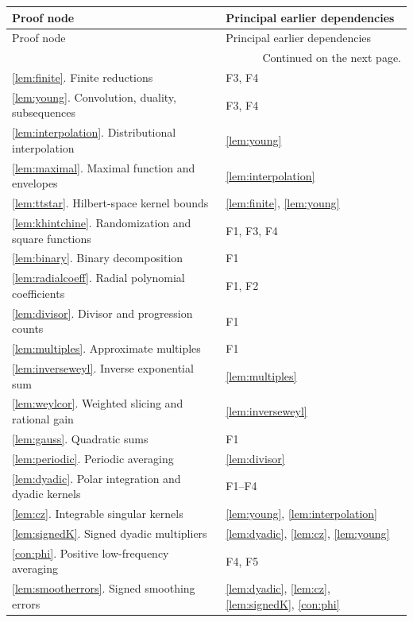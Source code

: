 \documentclass[11pt,oneside]{article}
\theoremstyle{definition}\newtheorem{definition}[theorem]{Definition}
\theoremstyle{remark}\newtheorem{remark}[theorem]{Remark}
\begin{document}
\begingroup
\small
\setlength{\tabcolsep}{5pt}
\renewcommand{\arraystretch}{1.2}
\begin{longtable}{@{}p{}p{}@{}}
\toprule
Proof node & Principal earlier dependencies \\
\midrule
\endfirsthead
\toprule
Proof node & Principal earlier dependencies \\
\midrule
\endhead
\midrule
\multicolumn{2}{r}{\footnotesize Continued on the next page.}\\
\endfoot
\bottomrule
\endlastfoot
\ref{lem:finite}. Finite reductions & F3, F4 \\
\ref{lem:young}. Convolution, duality, subsequences & F3, F4 \\
\ref{lem:interpolation}. Distributional interpolation & \ref{lem:young} \\
\ref{lem:maximal}. Maximal function and envelopes & \ref{lem:interpolation} \\
\ref{lem:ttstar}. Hilbert-space kernel bounds & \ref{lem:finite}, \ref{lem:young} \\
\ref{lem:khintchine}. Randomization and square functions & F1, F3, F4 \\
\ref{lem:binary}. Binary decomposition & F1 \\
\ref{lem:radialcoeff}. Radial polynomial coefficients & F1, F2 \\
\ref{lem:divisor}. Divisor and progression counts & F1 \\
\ref{lem:multiples}. Approximate multiples & F1 \\
\ref{lem:inverseweyl}. Inverse exponential sum & \ref{lem:multiples} \\
\ref{lem:weylcor}. Weighted slicing and rational gain & \ref{lem:inverseweyl} \\
\ref{lem:gauss}. Quadratic sums & F1 \\
\ref{lem:periodic}. Periodic averaging & \ref{lem:divisor} \\
\ref{lem:dyadic}. Polar integration and dyadic kernels & F1--F4 \\
\ref{lem:cz}. Integrable singular kernels & \ref{lem:young}, \ref{lem:interpolation} \\
\ref{lem:signedK}. Signed dyadic multipliers & \ref{lem:dyadic}, \ref{lem:cz}, \ref{lem:young} \\
\ref{con:phi}. Positive low-frequency averaging & F4, F5 \\
\ref{lem:smootherrors}. Signed smoothing errors & \ref{lem:dyadic}, \ref{lem:cz}, \ref{lem:signedK}, \ref{con:phi} \\

\end{longtable}
\end{document}

